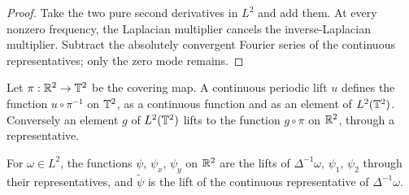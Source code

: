 \begin{proof}
\leanok
Take the two pure second derivatives in $L^2$ and add them.
At every nonzero frequency, the Laplacian multiplier cancels the
inverse-Laplacian multiplier. Subtract the absolutely convergent Fourier
series of the continuous representatives; only the zero mode remains.
\end{proof}

\begin{definition}
\label{def:torus-of-lift}
\leanok
Let $\pi:\mathbb{R}^2\to\mathbb{T}^2$ be the covering map. A continuous periodic lift $u$
defines the function $u\circ\pi^{-1}$ on $\mathbb{T}^2$, as a continuous function and as an
element of $L^2(\mathbb{T}^2)$. Conversely an element $g$ of $L^2(\mathbb{T}^2)$ lifts to the function
$g\circ\pi$ on $\mathbb{R}^2$, through a representative.
\end{definition}

\begin{definition}
\label{def:stream-lifts}
\leanok
For $\omega\in L^2$, the functions $\psi$, $\psi_x$, $\psi_y$ on $\mathbb{R}^2$ are the lifts of
$\Delta^{-1}\omega$, $\psi_1$, $\psi_2$ through their representatives, and $\tilde\psi$ is the
lift of the continuous representative of $\Delta^{-1}\omega$.
\end{definition}

